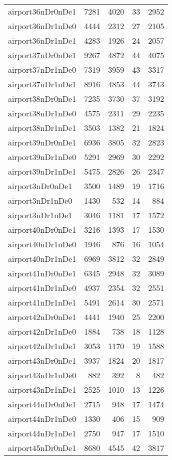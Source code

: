 \begin{longtable}{lrrrr}
airport36nDr0nDe1 & 7281 & 4020 & 33 & 2952 \\
airport36nDr1nDe0 & 4444 & 2312 & 27 & 2105 \\
airport36nDr1nDe1 & 4283 & 1926 & 24 & 2057 \\
airport37nDr0nDe1 & 9267 & 4872 & 44 & 4075 \\
airport37nDr1nDe0 & 7319 & 3959 & 43 & 3317 \\
airport37nDr1nDe1 & 8916 & 4853 & 44 & 3743 \\
airport38nDr0nDe1 & 7235 & 3730 & 37 & 3192 \\
airport38nDr1nDe0 & 4575 & 2311 & 29 & 2235 \\
airport38nDr1nDe1 & 3503 & 1382 & 21 & 1824 \\
airport39nDr0nDe1 & 6936 & 3805 & 32 & 2823 \\
airport39nDr1nDe0 & 5291 & 2969 & 30 & 2292 \\
airport39nDr1nDe1 & 5475 & 2826 & 26 & 2347 \\
airport3nDr0nDe1 & 3500 & 1489 & 19 & 1716 \\
airport3nDr1nDe0 & 1430 & 532 & 14 & 884 \\
airport3nDr1nDe1 & 3046 & 1181 & 17 & 1572 \\
airport40nDr0nDe1 & 3216 & 1393 & 17 & 1530 \\
airport40nDr1nDe0 & 1946 & 876 & 16 & 1054 \\
airport40nDr1nDe1 & 6969 & 3812 & 32 & 2849 \\
airport41nDr0nDe1 & 6345 & 2948 & 32 & 3089 \\
airport41nDr1nDe0 & 4937 & 2354 & 32 & 2551 \\
airport41nDr1nDe1 & 5491 & 2614 & 30 & 2571 \\
airport42nDr0nDe1 & 4441 & 1940 & 25 & 2200 \\
airport42nDr1nDe0 & 1884 & 738 & 18 & 1128 \\
airport42nDr1nDe1 & 3053 & 1170 & 19 & 1588 \\
airport43nDr0nDe1 & 3937 & 1824 & 20 & 1817 \\
airport43nDr1nDe0 & 882 & 392 & 8 & 482 \\
airport43nDr1nDe1 & 2525 & 1010 & 13 & 1226 \\
airport44nDr0nDe1 & 2715 & 948 & 17 & 1474 \\
airport44nDr1nDe0 & 1330 & 406 & 15 & 909 \\
airport44nDr1nDe1 & 2750 & 947 & 17 & 1510 \\
airport45nDr0nDe1 & 8680 & 4545 & 42 & 3817 \\

\end{longtable}
